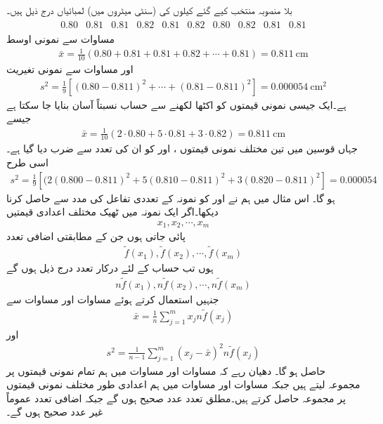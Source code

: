 \quad {}\\
بلا منصوبہ منتخب کیے گئے کیلوں کی  (سنٹی میٹروں میں) لمبائیاں درج ذیل ہیں۔
\begin{align*}
\begin{array}{cccccccccc}
0.80&0.81&0.81&0.82&0.81&0.82&0.80&0.82&0.81&0.81
\end{array}
\end{align*}
مساوات  سے نمونی اوسط
\begin{align*}
\bar{x}=\frac{1}{10}(0.80+0.81+0.81+0.82+\cdots+0.81)=\SI{0.811}{\centi\meter}
\end{align*}
اور مساوات  سے نمونی تغیریت
\begin{align*}
s^2=\frac{1}{9}[(0.80-0.811)^2+\cdots+(0.81-0.811)^2]=\SI{0.000054}{\centi\meter\squared}
\end{align*}
ہے۔ایک جیسی نمونی قیمتوں کو اکٹھا لکھنے سے حساب نسبتاً آسان بنایا جا سکتا ہے جیسے
\begin{align*}
\bar{x}=\frac{1}{10}(2\cdot 0.80+5\cdot 0.81+3\cdot 0.82)=\SI{0.811}{\centi\meter}
\end{align*} 
جہاں قوسین میں تین مختلف نمونی قیمتوں ،  اور  کو ان کی تعدد سے ضرب دیا گیا ہے۔اسی طرح
\begin{align*}
s^2=\frac{1}{9}[(2(0.800-0.811)^2+5(0.810-0.811)^2+3(0.820-0.811)^2]=\num{0.000054}
\end{align*}
ہو گا۔
اس مثال میں ہم نے  اور  کو نمونہ کے تعددی تفاعل  کی مدد سے حاصل کرنا دیکھا۔اگر ایک نمونہ میں ٹھیک  مختلف اعدادی قیمتیں 
\begin{align*}
x_1, x_2,\cdots, x_m
\end{align*}
پائی جاتی ہوں جن کے مطابقتی اضافی تعدد
\begin{align*}
\tilde{f}(x_1),\tilde{f}(x_2),\cdots,\tilde{f}(x_m)
\end{align*}
ہوں تب حساب کے لئے درکار تعدد درج ذیل ہوں گے
\begin{align*}
n\tilde{f}(x_1),n\tilde{f}(x_2),\cdots,n\tilde{f}(x_m)
\end{align*}
جنہیں استعمال کرتے ہوئے مساوات  اور مساوات  سے
\begin{align}\label{مساوات_شماریات_نمونی_اوسط_پ}
\bar{x}=\frac{1}{n}\sum_{j=1}^{m}x_jn\tilde{f}(x_j)
\end{align}
اور
\begin{align}\label{مساوات_شماریات_نمونی_اوسط_ت}
s^2=\frac{1}{n-1}\sum_{j=1}^{m} (x_j-\bar{x})^2n\tilde{f}(x_j)
\end{align}
حاصل ہو گا۔ دھیان رہے کہ مساوات  اور مساوات  میں ہم تمام نمونی قیمتوں پر مجموعہ لیتے ہیں جبکہ مساوات  اور مساوات  میں ہم اعدادی طور مختلف نمونی قیمتوں پر مجموعہ حاصل کرتے ہیں۔مطلق تعدد  عدد صحیح ہوں گے جبکہ اضافی تعدد  عموماً غیر عدد صحیح ہوں گے۔

